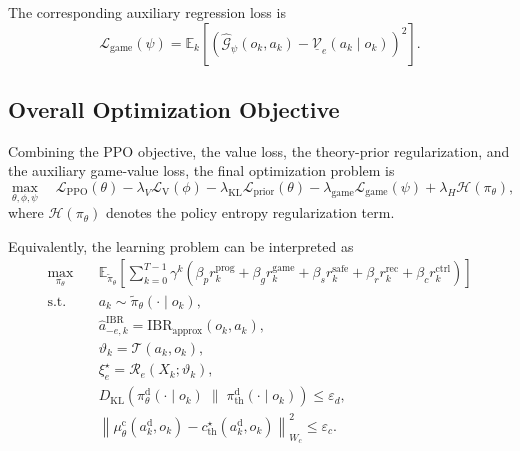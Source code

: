 \documentclass[final ,3p, times]{elsarticle}
\begin{document}
The corresponding auxiliary regression loss is
\begin{equation}
\mathcal{L}_{\mathrm{game}}(\psi)
=
\mathbb{E}_{k}
\left[
\left(
\hat{\mathcal{G}}_\psi(o_k,a_k)-\underline{\mathcal{V}}_e(a_k\mid o_k)
\right)^2
\right].
\label{eq:game_head_loss}
\end{equation}


\subsection{Overall Optimization Objective}
\label{subsec:overall_objective}

Combining the PPO objective, the value loss, the theory-prior regularization, and the auxiliary game-value loss, the final optimization problem is
\begin{equation}
\max_{\theta,\phi,\psi}
\quad
\mathcal{L}_{\mathrm{PPO}}(\theta)
-
\lambda_V \mathcal{L}_{\mathrm{V}}(\phi)
-
\lambda_{\mathrm{KL}} \mathcal{L}_{\mathrm{prior}}(\theta)
-
\lambda_{\mathrm{game}} \mathcal{L}_{\mathrm{game}}(\psi)
+
\lambda_H \mathcal{H}\!\left(\pi_\theta\right),
\label{eq:overall_training_objective}
\end{equation}
where $\mathcal{H}(\pi_\theta)$ denotes the policy entropy regularization term.

Equivalently, the learning problem can be interpreted as
\begin{equation}
\begin{aligned}
\max_{\pi_\theta}\quad
&
\mathbb{E}_{\tilde \pi_\theta}
\left[
\sum_{k=0}^{T-1}\gamma^k
\left(
\beta_p r_k^{\mathrm{prog}}
+
\beta_g r_k^{\mathrm{game}}
+
\beta_s r_k^{\mathrm{safe}}
+
\beta_r r_k^{\mathrm{rec}}
+
\beta_c r_k^{\mathrm{ctrl}}
\right)
\right]
\\
\text{s.t.}\quad
&
a_k \sim \tilde\pi_\theta(\cdot\mid o_k),
\\
&
\hat a_{-e,k}^{\mathrm{IBR}}
=
\mathrm{IBR}_{\mathrm{approx}}(o_k,a_k),
\\
&
\vartheta_k = \mathcal{T}(a_k,o_k),
\\
&
\xi_e^\star
=
\mathcal{R}_e(X_k;\vartheta_k),
\\
&
D_{\mathrm{KL}}
\left(
\pi_\theta^{\mathrm d}(\cdot\mid o_k)
\;\|\;
\pi_{\mathrm{th}}^{\mathrm d}(\cdot\mid o_k)
\right)
\le \varepsilon_d,
\\
&
\left\|
\mu_\theta^{\mathrm c}(a_k^{\mathrm d},o_k)
-
c_{\mathrm{th}}^\star(a_k^{\mathrm d},o_k)
\right\|_{W_c}^{2}
\le \varepsilon_c.
\end{aligned}
\label{eq:constrained_rl_formulation}
\end{equation}
\end{document}
